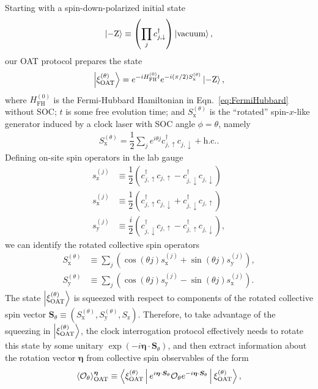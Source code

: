 \documentclass[aps,prx,superscriptaddress,notitlepage,twocolumn,longbibliography]{revtex4-1}
\renewcommand{\t}{\text} %
\newcommand{\f}[2]{\dfrac{#1}{#2}} %
\newcommand{\p}[1]{\left(#1\right)} %
\renewcommand{\c}{\cdot} %
\renewcommand{\v}{\bm} %
\newcommand{\bk}{\Braket}
\renewcommand{\ket}{\Ket}
\renewcommand{\O}{\mathcal{O}}
\newcommand{\z}{\text{z}}
\newcommand{\x}{\text{x}}
\newcommand{\y}{\text{y}}
\newcommand{\up}{\uparrow}
\newcommand{\dn}{\downarrow}
\begin{document}
Starting with a spin-down-polarized initial state
\begin{align}
  \ket{-\t{Z}}\equiv\p{\prod_j c_{j,\dn}^\dag}\ket{\t{vacuum}},
\end{align}
our OAT protocol prepares the state
\begin{align}
  \ket{\xi_{\t{OAT}}^{(\theta)}} = e^{-i H_{\t{FH}}^{(0)}t}
  e^{-i\p{\pi/2}S_\x^{(\theta)}} \ket{-\t{Z}},
\end{align}
where $H_{\t{FH}}^{(0)}$ is the Fermi-Hubbard Hamiltonian in Eqn.~\eqref{eq:FermiHubbard} without SOC; $t$ is some free evolution time; and $S_\x^{(\theta)}$ is the ``rotated'' spin-$x$-like generator induced by a clock laser with SOC angle $\phi=\theta$, namely
\begin{align}
  S_\x^{(\theta)}
  = \f12 \sum_j e^{i\theta j} c_{j,\up}^\dag c_{j,\dn} + \t{h.c.}.
\end{align}
Defining on-site spin operators in the lab gauge 
\begin{align}
  s_\z^{(j)} &\equiv \f12 \p{ c_{j,\up}^\dag c_{j,\up}
    - c_{j,\dn}^\dag c_{j,\dn}} \\
  s_\x^{(j)} &\equiv \f12 \p{c_{j,\up}^\dag c_{j,\dn}
    + c_{j,\dn}^\dag c_{j,\up}} \\
  s_\y^{(j)} &\equiv \f{i}{2} \p{c_{j,\dn}^\dag c_{j,\up}
    - c_{j,\up}^\dag c_{j,\dn}},
\end{align}
we can identify the rotated collective spin operators
\begin{align}
  S_\x^{(\theta)} &\equiv \sum_j \p{\cos\p{\theta j} s_\x^{(j)}
  + \sin\p{\theta j} s_\y^{(j)}},
  \label{eq:S_x_theta} \\
  S_\y^{(\theta)} &\equiv \sum_j \p{\cos\p{\theta j} s_\y^{(j)}
  - \sin\p{\theta j} s_\x^{(j)}}.
  \label{eq:S_y_theta}
\end{align}
The state $\ket{\xi_{\t{OAT}}^{(\theta)}}$ is squeezed with respect to components of the rotated collective spin vector $\v S_\theta \equiv \p{S_\x^{(\theta)},S_\y^{(\theta)},S_\z}$.
Therefore, to take advantage of the squeezing in $\ket{\xi_{\t{OAT}}^{(\theta)}}$, the clock interrogation protocol effectively needs to rotate this state by some unitary $\exp\p{-i\v\eta\c\v S_\theta}$, and then extract information about the rotation vector $\v\eta$ from collective spin observables of the form
\begin{align}
  \bk{\O_\theta}_{\t{OAT}}^{\v\eta}
  \equiv \bk{\xi_{\t{OAT}}^{(\theta)}| e^{i\v\eta\c\v S_\theta}
    \O_\theta e^{-i\v\eta\c\v S_\theta} |\xi_{\t{OAT}}^{(\theta)}},
\end{align}
\end{document}
